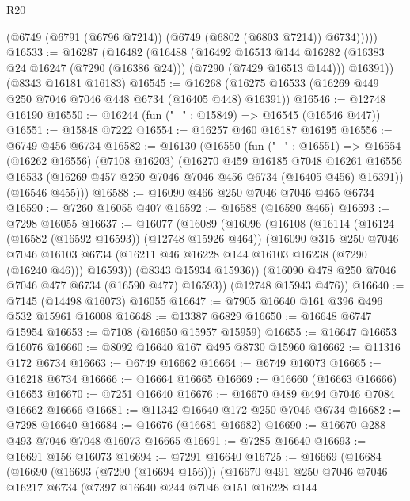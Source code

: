 \begin{lexlean}{R20}
\begin{coremodule}
{          (@6749 (@6791 (@6796 @7214)) (@6749 (@6802 (@6803 @7214)) @6734)))))
@16533 := @16287
    (@16482
      (@16488
        (@16492
          @16513
          @144
          @16282
          (@16383 @24 @16247 (@7290 (@16386 @24)))
          (@7290 (@7429 @16513 @144)))
        @16391))
    (@8343 @16181 @16183)
@16545 := @16268 (@16275 @16533 (@16269 @449 @250 @7046 @7046 @448 @6734 (@16405 @448) @16391))
@16546 := @12748 @16190
@16550 := @16244 (fun ("_" : @15849) => @16545 (@16546 @447))
@16551 := @15848 @7222
@16554 := @16257 @460 @16187 @16195
@16556 := @6749 @456 @6734
@16582 := @16130
    (@16550
      (fun ("_" : @16551) =>
      @16554
        (@16262 @16556)
        (@7108 @16203)
        (@16270
          @459
          @16185
          @7048
          @16261
          @16556
          @16533
          (@16269 @457 @250 @7046 @7046 @456 @6734 (@16405 @456) @16391))
        (@16546 @455)))
@16588 := @16090 @466 @250 @7046 @7046 @465 @6734
@16590 := @7260 @16055 @407
@16592 := @16588 (@16590 @465)
@16593 := @7298 @16055
@16637 := @16077
    (@16089
      (@16096
        (@16108
          (@16114
            (@16124 (@16582 (@16592 @16593)) (@12748 @15926 @464))
            (@16090
              @315
              @250
              @7046
              @7046
              @16103
              @6734
              (@16211 @46 @16228 @144 @16103 @16238 (@7290 (@16240 @46)))
              @16593))
          (@8343 @15934 @15936))
        (@16090 @478 @250 @7046 @7046 @477 @6734 (@16590 @477) @16593))
      (@12748 @15943 @476))
@16640 := @7145 (@14498 @16073) @16055
@16647 := @7905 @16640 @161 @396 @496 @532 @15961 @16008
@16648 := @13387 @6829
@16650 := @16648 @6747 @15954
@16653 := @7108 (@16650 @15957 @15959)
@16655 := @16647 @16653 @16076
@16660 := @8092 @16640 @167 @495 @8730 @15960
@16662 := @11316 @172 @6734
@16663 := @6749 @16662
@16664 := @6749 @16073
@16665 := @16218 @6734
@16666 := @16664 @16665
@16669 := @16660 (@16663 @16666) @16653
@16670 := @7251 @16640
@16676 := @16670 @489 @494 @7046 @7084 @16662 @16666
@16681 := @11342 @16640 @172 @250 @7046 @6734
@16682 := @7298 @16640
@16684 := @16676 (@16681 @16682)
@16690 := @16670 @288 @493 @7046 @7048 @16073 @16665
@16691 := @7285 @16640
@16693 := @16691 @156 @16073
@16694 := @7291 @16640
@16725 := @16669
    (@16684
      (@16690
        (@16693 (@7290 (@16694 @156)))
        (@16670
          @491
          @250
          @7046
          @7046
          @16217
          @6734
          (@7397
            @16640
            @244
            @7046
            @151
            @16228
            @144
}
\end{coremodule}
\end{lexlean}

